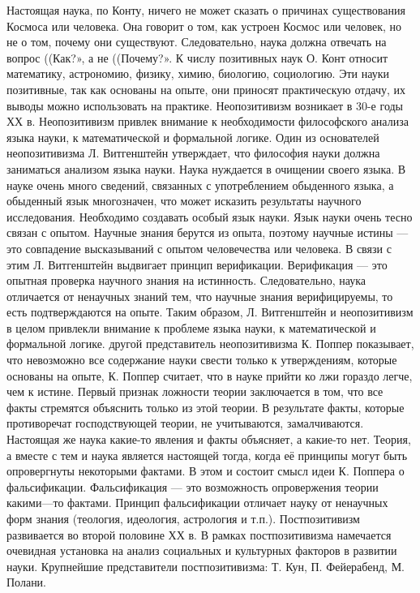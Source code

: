 \documentclass[12pt, specialist, subf, substylefile = spbu.rtx]{disser}
\begin{document}
Настоящая наука, по Конту, ничего не может сказать о причинах существования Космоса или человека. Она говорит о том, как устроен Космос или человек, но не о том, почему они существуют. Следовательно, наука должна отвечать на вопрос ((Как?», а не ((Почему?». 
К числу позитивных наук О. Конт относит математику, астрономию, физику, химию, биологию, социологию. Эти науки позитивные, так как основаны на опыте, они приносят практическую отдачу, их выводы можно использовать на практике. 
Неопозитивизм возникает в 30-е годы ХХ в. Неопозитивизм привлек внимание к необходимости философского анализа языка науки, к математической и формальной логике. 
Один из основателей неопозитивизма Л. Витгенштейн утверждает, что философия науки должна заниматься анализом языка науки. Наука нуждается в очищении своего языка. В науке очень много сведений, связанных с употреблением обыденного языка, а обыденный язык многозначен, что может исказить результаты научного исследования. Необходимо создавать особый язык науки. Язык науки очень тесно связан с опытом. Научные знания берутся из опыта, поэтому научные истины — это совпадение высказываний с опытом человечества или человека. В связи с этим 
Л. Витгенштейн выдвигает принцип верификации. Верификация — это опытная проверка научного знания на истинность. Следовательно, наука отличается от ненаучных знаний тем, что научные знания верифицируемы, то есть подтверждаются на опыте. Таким образом, Л. Витгенштейн и неопозитивизм в целом привлекли внимание к проблеме языка науки, к математической и формальной логике. 
другой представитель неопозитивизма К. Поппер показывает, что невозможно все содержание науки свести только к утверждениям, которые основаны на опыте, К. Поппер считает, что в науке прийти ко лжи гораздо легче, чем к истине. Первый признак ложности теории заключается в том, что все факты стремятся объяснить только из этой теории. 
В результате факты, которые противоречат господствующей теории, не учитываются, замалчиваются. Настоящая же наука какие-то явления и факты объясняет, а какие-то нет. Теория, а вместе с тем и наука является настоящей тогда, когда её принципы могут быть опровергнуты некоторыми фактами. В этом и состоит смысл идеи К. Поппера о фальсификации. Фальсификация — это возможность опровержения теории какими—то фактами. Принцип фальсификации отличает науку от ненаучных форм знания (теология, идеология, астрология и т.п.). 
Постпозитивизм развивается во второй половине ХХ в. В рамках постпозитивизма намечается очевидная установка на анализ социальных и культурных факторов в развитии науки. Крупнейшие представители постпозитивизма: Т. Кун, П. Фейерабенд, М. Полани. 
\end{document}
